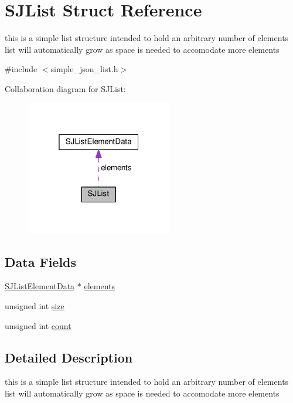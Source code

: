 \hypertarget{structSJList}{}\section{S\+J\+List Struct Reference}
\label{structSJList}


this is a simple list structure intended to hold an arbitrary number of elements list will automatically grow as space is needed to accomodate more elements  




{\ttfamily \#include $<$simple\+\_\+json\+\_\+list.\+h$>$}



Collaboration diagram for S\+J\+List\+:
\nopagebreak
\begin{figure}[H]
\begin{center}
\leavevmode
\includegraphics[width=181pt]{d5/d2e/structSJList__coll__graph}
\end{center}
\end{figure}
\subsection*{Data Fields}
\begin{DoxyCompactItemize}
\item 
\hyperlink{structSJListElementData}{S\+J\+List\+Element\+Data} $\ast$ \hyperlink{structSJList_a43fc72ebe9774607d3c503917b911c7c}{elements}
\item 
unsigned int \hyperlink{structSJList_a1e3944d88b5e2aac09698498f376559b}{size}
\item 
unsigned int \hyperlink{structSJList_a706017d74f3cde16157127d8e8025116}{count}
\end{DoxyCompactItemize}


\subsection{Detailed Description}
this is a simple list structure intended to hold an arbitrary number of elements list will automatically grow as space is needed to accomodate more elements 

